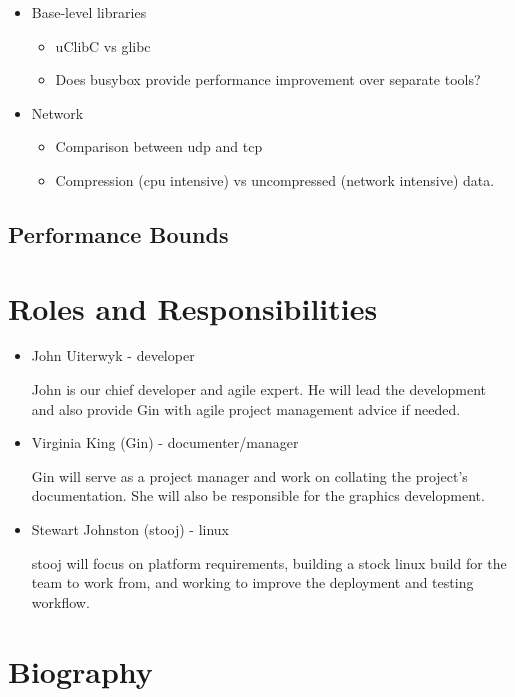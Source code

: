 \documentclass[a4paper]{article}
\begin{document}
\begin{itemize}
  \item Base-level libraries
    \begin{itemize}
      \item uClibC vs glibc
      \item Does busybox provide performance improvement over separate tools?
    \end{itemize}
  \item Network
    \begin{itemize}
      \item Comparison between udp and tcp
      \item Compression (cpu intensive) vs uncompressed (network intensive)
        data.
    \end{itemize}
\end{itemize}

\subsection{Performance Bounds}

\section{Roles and Responsibilities}

\begin{itemize}
  \item John Uiterwyk - developer

    John is our chief developer and agile expert. He will lead the development
    and also provide Gin with agile project management advice if needed.

  \item Virginia King (Gin) - documenter/manager

    Gin will serve as a project manager and work on collating the project's
    documentation. She will also be responsible for the graphics development.

  \item Stewart Johnston (stooj) - linux

    stooj will focus on platform requirements, building a stock linux build
    for the team to work from, and working to improve the deployment and
    testing workflow.

\end{itemize}

\section{Biography}
\end{document}
